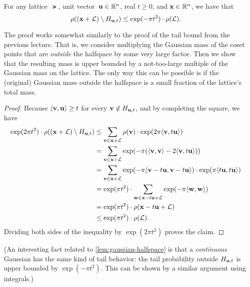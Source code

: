 \documentclass[11pt]{article}
\begin{document}
\begin{lemma}
  \label{lem:gaussian-halfspace}
  For any lattice~$\lat$, unit vector~$\mathbf{u} \in \mathbb{R}^{n}$, real
  $t \geq 0$, and $\mathbf{x} \in \mathbb{R}^n$, we have that
  \[ \rho((\mathbf{x}+\mathcal{L}) \setminus H_{\mathbf{u},t}) \leq \exp(-\pi t^2)
    \cdot \rho(\mathcal{L}) . \]
\end{lemma}

The proof works somewhat similarly to the proof of the tail bound from
the previous lecture. That is, we consider multiplying the Gaussian
mass of the coset points that are \emph{outside} the halfspace by some
very large factor. Then we show that the resulting mass is upper
bounded by a not-too-large multiple of the Gaussian mass on the
lattice. The only way this can be possible is if the (original)
Gaussian mass outside the halfspace is a small fraction of the
lattice's total mass.

\begin{proof}
  Because $\langle\mathbf{v}, \mathbf{u}\rangle \geq t$ for every
  $\mathbf{v} \not\in H_{\mathbf{u},t}$, and by completing the square, we have
  \begin{align*}
    \exp(2 \pi t^{2}) \cdot \rho((\mathbf{x}+\mathcal{L}) \setminus H_{\mathbf{u},t})
    &\leq \sum_{\mathbf{v} \in \mathbf{x}+\mathcal{L}} \rho(\mathbf{v}) \cdot \exp(2\pi
      \langle\mathbf{v}, t\mathbf{u}\rangle) \\
    &= \sum_{\mathbf{v} \in \mathbf{x}+\mathcal{L}} \exp(-\pi (\langle\mathbf{v},\mathbf{v}\rangle -
      2 \langle\mathbf{v}, t\mathbf{u}\rangle)) \\
    &= \sum_{\mathbf{v} \in \mathbf{x}+\mathcal{L}} \exp(-\pi \langle\mathbf{v}-t\mathbf{u},
      \mathbf{v}-t\mathbf{u}\rangle) \cdot \exp(\pi \langle t \mathbf{u}, t \mathbf{u}\rangle) \\
    &= \exp(\pi t^{2}) \cdot \sum_{\mathbf{w} \in \mathbf{x}-t\mathbf{u} + \mathcal{L}}
      \exp(-\pi \langle\mathbf{w},\mathbf{w}\rangle) \\
    &= \exp(\pi t^{2}) \cdot \rho(\mathbf{x}-t\mathbf{u} + \mathcal{L}) \\
    &\leq \exp(\pi t^{2}) \cdot \rho(\mathcal{L}) .
  \end{align*}
  Dividing both sides of the inequality by $\exp(2 \pi t^2)$ proves
  the claim.
\end{proof}

(An interesting fact related to \cref{lem:gaussian-halfspace} is that
a \emph{continuous} Gaussian has the same kind of tail behavior: the
tail probability outside $H_{\mathbf{u},t}$ is upper bounded by
$\exp(-\pi t^2)$. This can be shown by a similar argument using
integrals.)
\end{document}

